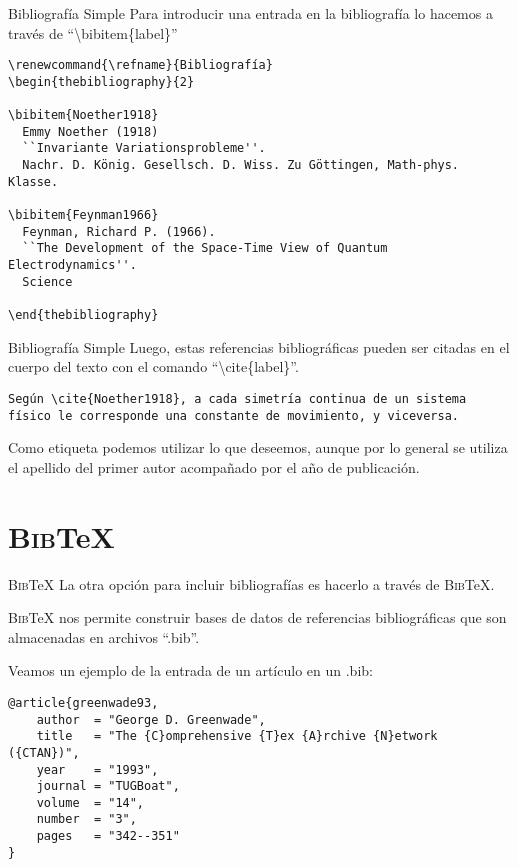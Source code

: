 \documentclass[11pt]{beamer}
\newcommand{\BibTeX}{\textsc{Bib}\TeX{}}
\begin{document}
\begin{frame}[fragile]{Bibliografía Simple}
Para introducir una entrada en la bibliografía lo hacemos a través de ``\textbackslash bibitem\{label\}''

{\color{new_green} \scriptsize
\begin{verbatim}
\renewcommand{\refname}{Bibliografía}
\begin{thebibliography}{2}

\bibitem{Noether1918}
  Emmy Noether (1918)
  ``Invariante Variationsprobleme''.
  Nachr. D. König. Gesellsch. D. Wiss. Zu Göttingen, Math-phys. Klasse.

\bibitem{Feynman1966}
  Feynman, Richard P. (1966).
  ``The Development of the Space-Time View of Quantum Electrodynamics''.
  Science

\end{thebibliography}
\end{verbatim}
}
\end{frame}


\begin{frame}[fragile]{Bibliografía Simple}
Luego, estas referencias bibliográficas pueden ser citadas en el cuerpo del texto con el comando ``\textbackslash cite\{label\}''.

{\color{new_green} \scriptsize
\begin{verbatim}
Según \cite{Noether1918}, a cada simetría continua de un sistema
físico le corresponde una constante de movimiento, y viceversa.
\end{verbatim}
}

Como etiqueta podemos utilizar lo que deseemos, aunque por lo general se utiliza el apellido del primer autor acompañado por el año de publicación.

\end{frame}


\section{\BibTeX{}}


\begin{frame}[fragile]{\BibTeX{}}
La otra opción para incluir bibliografías es hacerlo a través de \BibTeX{}.

\BibTeX{} nos permite construir bases de datos de referencias bibliográficas que son almacenadas en archivos ``.bib''.

Veamos un ejemplo de la entrada de un artículo en un .bib:

{\color{new_green} \scriptsize
\begin{verbatim}
@article{greenwade93,
    author  = "George D. Greenwade",
    title   = "The {C}omprehensive {T}ex {A}rchive {N}etwork ({CTAN})",
    year    = "1993",
    journal = "TUGBoat",
    volume  = "14",
    number  = "3",
    pages   = "342--351"
}
\end{verbatim}
}
\end{frame}
\end{document}
